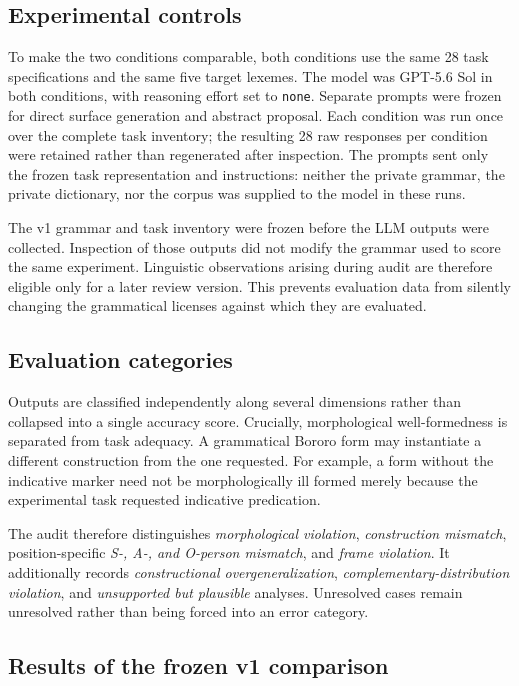 \documentclass[11pt]{article}
\begin{document}
\subsection{Experimental controls}

To make the two conditions comparable, both conditions use the same 28 task
specifications and the same five target lexemes. The model was GPT-5.6 Sol in
both conditions, with reasoning effort set to \texttt{none}. Separate prompts
were frozen for direct surface generation and abstract proposal. Each condition
was run once over the complete task inventory; the resulting 28 raw responses
per condition were retained rather than regenerated after inspection. The
prompts sent only the frozen task representation and instructions: neither the
private grammar, the private dictionary, nor the corpus was supplied to the
model in these runs.

The v1 grammar and task inventory were frozen before the LLM outputs were
collected. Inspection of those outputs did not modify the grammar used to score
the same experiment. Linguistic observations arising during audit are therefore
eligible only for a later review version. This prevents evaluation data from
silently changing the grammatical licenses against which they are evaluated.

\subsection{Evaluation categories}

Outputs are classified independently along several dimensions rather than
collapsed into a single accuracy score. Crucially, morphological well-formedness
is separated from task adequacy. A grammatical Bororo form may instantiate a
different construction from the one requested. For example, a form without the
indicative marker need not be morphologically ill formed merely because the
experimental task requested indicative predication.

The audit therefore distinguishes \emph{morphological violation},
\emph{construction mismatch}, position-specific \emph{S-, A-, and O-person
mismatch}, and \emph{frame violation}. It additionally records
\emph{constructional overgeneralization}, \emph{complementary-distribution
violation}, and \emph{unsupported but plausible} analyses. Unresolved cases
remain unresolved rather than being forced into an error category.

 \subsection{Results of the frozen v1 comparison}
\end{document}
